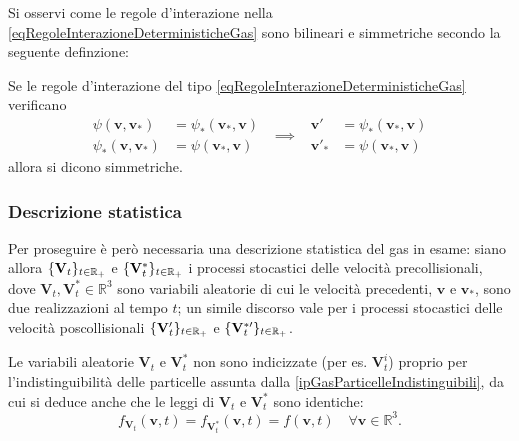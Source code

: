                 Si osservi come le regole d'interazione nella \ref{eqRegoleInterazioneDeterministicheGas} sono bilineari e simmetriche secondo la seguente definzione:

                \begin{dfn}
                    \label{defLeggiInterazioneSimmetricheGas}
                    Se le regole d'interazione del tipo \eqref{eqRegoleInterazioneDeterministicheGas} verificano
                    \[
                        \begin{aligned}
                            \psi(\mathbf v,\mathbf v_*)&=\psi_*(\mathbf v_*,\mathbf v)\\
                            \psi_*(\mathbf v,\mathbf v_*)&=\psi(\mathbf v_*,\mathbf v)
                        \end{aligned}
                        \ \ \implies\ \ 
                        \begin{aligned}
                            \mathbf v'&=\psi_*(\mathbf v_*,\mathbf v)\\
                            \mathbf v'_*&=\psi(\mathbf v_*,\mathbf v)
                        \end{aligned}
                    \]
                    allora si dicono simmetriche.
                \end{dfn}

            \subsubsection{Descrizione statistica}

                Per proseguire è però necessaria una descrizione statistica del gas in esame: siano allora \(\{\mathbf V_t\}_{t\in\mathbb R_+}\) e \(\{\mathbf V_t^*\}_{t\in\mathbb R_+}\) i processi stocastici delle velocità precollisionali, dove \(\mathbf V_t,\mathbf V_t^*\in\mathbb R^3\) sono variabili aleatorie di cui le velocità precedenti, \(\mathbf v\) e \(\mathbf v_*\), sono due realizzazioni al tempo \(t\); un simile discorso vale per i processi stocastici delle velocità poscollisionali \(\{\mathbf V'_t\}_{t\in\mathbb R_+}\) e \(\{\mathbf V^{*\prime}_t\}_{t\in\mathbb R_+}\).

                \begin{oss}
                    \label{ossLeggiIndistinguibili}
                    Le variabili aleatorie \(\mathbf V_t\) e \(\mathbf V^*_t\) non sono indicizzate (per es. \(\mathbf V^i_t\)) proprio per l'indistinguibilità delle particelle assunta dalla \ref{ipGasParticelleIndistinguibili}, da cui si deduce anche che le leggi di \(\mathbf V_t\) e \(\mathbf V^*_t\) sono identiche:
                    \[
                        f_{\mathbf V_t}(\mathbf v,t)=f_{\mathbf V^*_t}(\mathbf v,t)=f(\mathbf v,t)\quad\forall \mathbf v\in\mathbb R^3.
                    \]
                \end{oss}

